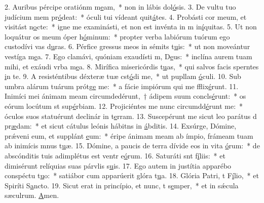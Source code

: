 2. Auribus pércipe oratiónm m\uline{e}am,~* non in lábis dol\uline{ó}sis.
3. De vultu tuo judícium mem pr\uline{ó}deat:~* óculi tui vídeant quit\uline{á}tes.
4. Probásti cor meum, et visitást n\uline{o}cte:~* igne me examinásti, et non est invénta in m in\uline{í}quitas.
5. Ut non loquátur os meum óper h\uline{ó}minum:~* propter verba labiórum tuórum ego custodívi vas d\uline{u}ras.
6. Pérfice gressus meos in sémits t\uline{u}is:~* ut non moveántur vestíga m\uline{e}a.
7. Ego clamávi, quóniam exaudísti m, D\uline{e}us:~* inclína aurem tuam mihi, et exáudi vrba m\uline{e}a.
8. Mirífica misericórdis t\uline{u}as,~* qui salvos facis sperntes \uline{i}n te.
9. A resisténtibus déxteræ tuæ cst\uline{ó}di me,~* ut pupllam \uline{ó}culi.
10. Sub umbra alárum tuárum prótg\uline{e} me:~* a fácie impiórum qui me fflix\uline{é}runt.
11. Inimíci mei ánimam meam circumdedérunt,~† ádipem suum concls\uline{é}runt:~* os eórum locútum st sup\uline{é}rbiam.
12. Projiciéntes me nunc circumdd\uline{é}runt me:~* óculos suos statuérunt declinár in t\uline{e}rram.
13. Suscepérunt me sicut leo parátus d pr\uline{æ}dam:~* et sicut cátulus leónis hábitns in \uline{á}bditis.
14. Exsúrge, Dómine, prǽveni eum, et supplánt \uline{e}um:~* éripe ánimam meam ab ímpio, frámeam tuam ab inimícis mnus t\uline{u}æ.
15. Dómine, a paucis de terra dívide eos in vita \uline{ó}rum:~* de abscónditis tuis adimplétus est ventr e\uline{ó}rum.
16. Saturáti snt f\uline{í}liis:~* et dimisérunt relíquias suas párvlis s\uline{u}is.
17. Ego autem in justítia apparébo conspéctu t\uline{u}o:~* satiábor cum apparúerit glóra t\uline{u}a.
18. Glória Patri, t F\uline{í}lio,~* et Spiríti S\uline{a}ncto.
19. Sicut erat in princípio, et nunc, t s\uline{e}mper,~* et in sǽcula sæculrum. \uline{A}men.
